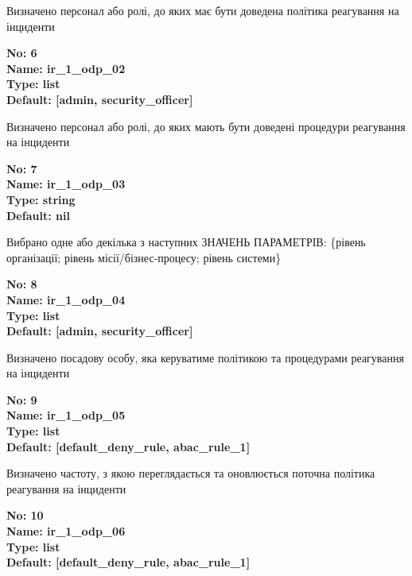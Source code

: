 \documentclass{article}
\begin{document}
{\footnotesize Визначено персонал або ролі, до яких має бути доведена політика реагування на інциденти}


{\footnotesize\bfseries
No: 6\\
Name: ir\_\allowbreak{}1\_\allowbreak{}odp\_\allowbreak{}02\\
Type: list\\
Default: [\textquotedbl{}admin\textquotedbl{}, \textquotedbl{}security\_\allowbreak{}officer\textquotedbl{}]
}

{\footnotesize Визначено персонал або ролі, до яких мають бути доведені процедури реагування на інциденти}


{\footnotesize\bfseries
No: 7\\
Name: ir\_\allowbreak{}1\_\allowbreak{}odp\_\allowbreak{}03\\
Type: string\\
Default: nil
}

{\footnotesize Вибрано одне або декілька з наступних ЗНАЧЕНЬ ПАРАМЕТРІВ: \{рівень організації; рівень місії/бізнес-процесу; рівень системи\}}


{\footnotesize\bfseries
No: 8\\
Name: ir\_\allowbreak{}1\_\allowbreak{}odp\_\allowbreak{}04\\
Type: list\\
Default: [\textquotedbl{}admin\textquotedbl{}, \textquotedbl{}security\_\allowbreak{}officer\textquotedbl{}]
}

{\footnotesize Визначено посадову особу, яка керуватиме політикою та процедурами реагування на інциденти}


{\footnotesize\bfseries
No: 9\\
Name: ir\_\allowbreak{}1\_\allowbreak{}odp\_\allowbreak{}05\\
Type: list\\
Default: [\textquotedbl{}default\_\allowbreak{}deny\_\allowbreak{}rule\textquotedbl{}, \textquotedbl{}abac\_\allowbreak{}rule\_\allowbreak{}1\textquotedbl{}]
}

{\footnotesize Визначено частоту, з якою переглядається та оновлюється поточна політика реагування на інциденти}


{\footnotesize\bfseries
No: 10\\
Name: ir\_\allowbreak{}1\_\allowbreak{}odp\_\allowbreak{}06\\
Type: list\\
Default: [\textquotedbl{}default\_\allowbreak{}deny\_\allowbreak{}rule\textquotedbl{}, \textquotedbl{}abac\_\allowbreak{}rule\_\allowbreak{}1\textquotedbl{}]
}
\end{document}
